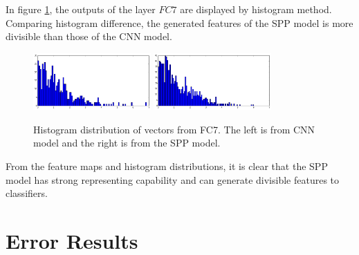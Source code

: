 In figure \ref{fig:fc7_hist_output}, the outputs of the layer $FC7$ are displayed by histogram method. Comparing histogram difference, the generated features of the SPP model is more divisible than those of the CNN model.
\begin{figure}[htb]
    \centering
	\includegraphics[width=0.4\textwidth]{sunny2_hist_caffe_fc7.png}
	\includegraphics[width=0.4\textwidth]{sunny2_hist_spp_fc7.png}
    \caption{Histogram distribution of vectors from FC7. The left is from CNN model and the right is from the SPP model.}%
    \label{fig:fc7_hist_output}%
\end{figure}

From the feature maps and histogram distributions, it is clear that the SPP model has strong representing capability and can generate divisible features to classifiers.

\section{Error Results}

